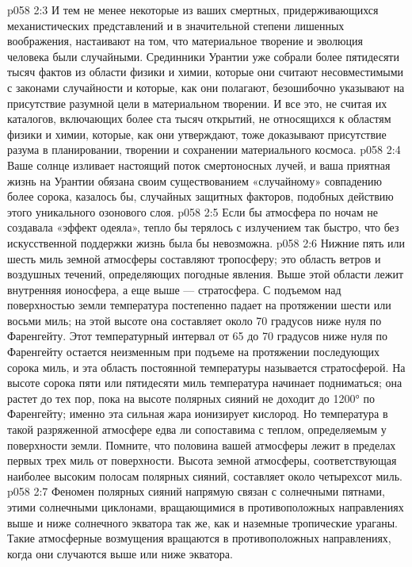 \vs p058 2:3 И тем не менее некоторые из ваших смертных, придерживающихся механистических представлений и в значительной степени лишенных воображения, настаивают на том, что материальное творение и эволюция человека были случайными. Срединники Урантии уже собрали более пятидесяти тысяч фактов из области физики и химии, которые они считают несовместимыми с законами случайности и которые, как они полагают, безошибочно указывают на присутствие разумной цели в материальном творении. И все это, не считая их каталогов, включающих более ста тысяч открытий, не относящихся к областям физики и химии, которые, как они утверждают, тоже доказывают присутствие разума в планировании, творении и сохранении материального космоса.
\vs p058 2:4 Ваше солнце изливает настоящий поток смертоносных лучей, и ваша приятная жизнь на Урантии обязана своим существованием «случайному» совпадению более сорока, казалось бы, случайных защитных факторов, подобных действию этого уникального озонового слоя.
\vs p058 2:5 Если бы атмосфера по ночам не создавала «эффект одеяла», тепло бы терялось с излучением так быстро, что без искусственной поддержки жизнь была бы невозможна.
\vs p058 2:6 \pc Нижние пять или шесть миль земной атмосферы составляют тропосферу; это область ветров и воздушных течений, определяющих погодные явления. Выше этой области лежит внутренняя ионосфера, а еще выше --- стратосфера. С подъемом над поверхностью земли температура постепенно падает на протяжении шести или восьми миль; на этой высоте она составляет около 70 градусов ниже нуля по Фаренгейту. Этот температурный интервал от 65 до 70 градусов ниже нуля по Фаренгейту остается неизменным при подъеме на протяжении последующих сорока миль, и эта область постоянной температуры называется стратосферой. На высоте сорока пяти или пятидесяти миль температура начинает подниматься; она растет до тех пор, пока на высоте полярных сияний не доходит до 1200° по Фаренгейту; именно эта сильная жара ионизирует кислород. Но температура в такой разряженной атмосфере едва ли сопоставима с теплом, определяемым у поверхности земли. Помните, что половина вашей атмосферы лежит в пределах первых трех миль от поверхности. Высота земной атмосферы, соответствующая наиболее высоким полосам полярных сияний, составляет около четырехсот миль.
\vs p058 2:7 Феномен полярных сияний напрямую связан с солнечными пятнами, этими солнечными циклонами, вращающимися в противоположных направлениях выше и ниже солнечного экватора так же, как и наземные тропические ураганы. Такие атмосферные возмущения вращаются в противоположных направлениях, когда они случаются выше или ниже экватора.
